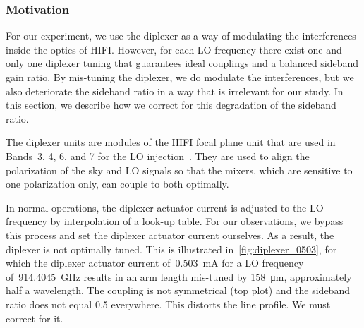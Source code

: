 \subsubsection{Motivation}
For our experiment, we use the diplexer as a way of modulating the interferences inside the optics of HIFI.
However, for each LO frequency there exist one and only one diplexer tuning that guarantees ideal couplings and a balanced sideband gain ratio.
By mis-tuning the diplexer, we do modulate the interferences, but we also deteriorate the sideband ratio in a way that is irrelevant for our study.
In this section, we describe how we correct for this degradation of the sideband ratio.

The diplexer units are modules of the HIFI focal plane unit that are used in Bands~3, 4, 6, and 7 for the LO injection~\parencite{jackson2002hifi}.
They are used to align the polarization of the sky and LO signals so that the mixers, which are sensitive to one polarization only, can couple to both optimally.




In normal operations, the diplexer actuator current is adjusted to the LO frequency by interpolation of a look-up table.
For our observations, we bypass this process and set the diplexer actuator current ourselves.
As a result, the diplexer is not optimally tuned.
This is illustrated in~\cref{fig:diplexer_0503}, for which the diplexer actuator current of~\SI{0.503}{\milli\ampere} for a LO frequency of~\SI{914.4045}{\giga\hertz} results in an arm length mis-tuned by \SI{158}{\micro\meter}, approximately half a wavelength.
The coupling is not symmetrical (top plot) and the sideband ratio does not equal \num{0.5} everywhere.
This distorts the line profile.
We must correct for it.


